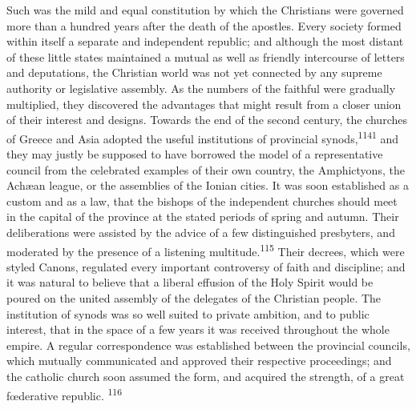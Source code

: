 Such was the mild and equal constitution by which the Christians
were governed more than a hundred years after the death of the
apostles. Every society formed within itself a separate and
independent republic; and although the most distant of these
little states maintained a mutual as well as friendly intercourse
of letters and deputations, the Christian world was not yet
connected by any supreme authority or legislative assembly. As
the numbers of the faithful were gradually multiplied, they
discovered the advantages that might result from a closer union
of their interest and designs. Towards the end of the second
century, the churches of Greece and Asia adopted the useful
institutions of provincial synods,\textsuperscript{1141} and they may justly be
supposed to have borrowed the model of a representative council
from the celebrated examples of their own country, the
Amphictyons, the Achæan league, or the assemblies of the Ionian
cities. It was soon established as a custom and as a law, that
the bishops of the independent churches should meet in the
capital of the province at the stated periods of spring and
autumn. Their deliberations were assisted by the advice of a few
distinguished presbyters, and moderated by the presence of a
listening multitude.\textsuperscript{115} Their decrees, which were styled Canons,
regulated every important controversy of faith and discipline;
and it was natural to believe that a liberal effusion of the Holy
Spirit would be poured on the united assembly of the delegates of
the Christian people. The institution of synods was so well
suited to private ambition, and to public interest, that in the
space of a few years it was received throughout the whole empire.
A regular correspondence was established between the provincial
councils, which mutually communicated and approved their
respective proceedings; and the catholic church soon assumed the
form, and acquired the strength, of a great fœderative republic. \textsuperscript{116}


